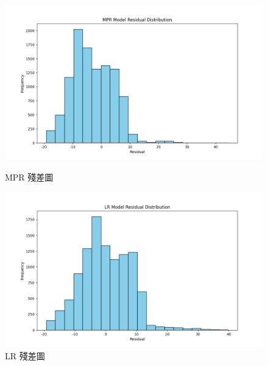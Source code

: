 \documentclass[12pt,a4paper]{article}
\begin{document}
\begin{enumerate}
\begin{enumerate}[label=\arabic*.]
\begin{enumerate}[label=3-2-\arabic*.]
\begin{enumerate}[label=\Alph*.]
\begin{figure}[H]
\begin{minipage}[t]{0.4\textwidth}
                        \end{minipage}
                        \vspace{0.001\textwidth}
                        \begin{minipage}[t]{0.4\textwidth}
                            \centering
                            \includegraphics[width=\textwidth]{resources/image/ResidualPlot/MPR.png}
                            \caption{MPR 殘差圖}
                            \label{fig:residual_mpr}
                        \end{minipage}
                        \hspace{0.001\textwidth}
                        \begin{minipage}[t]{0.4\textwidth}
                            \centering
                            \includegraphics[width=\textwidth]{resources/image/ResidualPlot/LR.png}
                            \caption{LR 殘差圖}
                            \label{fig:residual_lr}
                        \end{minipage}

\end{figure}
\end{enumerate}
\end{enumerate}
\end{enumerate}
\end{enumerate}
\end{document}
